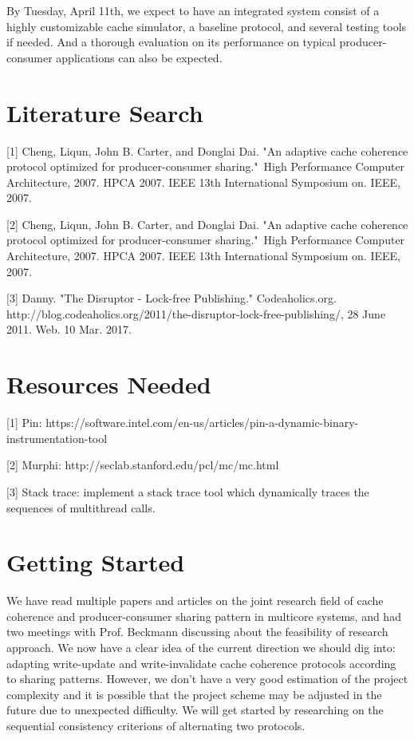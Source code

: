 \documentclass{article} %
\begin{document}
By Tuesday, April 11th, we expect to have an integrated system consist of a highly customizable cache simulator, a baseline protocol, and several testing tools if needed. And a thorough evaluation on its performance on typical producer-consumer applications can also be expected.


\section{Literature Search}

\small{
[1] Cheng, Liqun, John B. Carter, and Donglai Dai. "An adaptive cache coherence protocol optimized for producer-consumer sharing." High Performance Computer Architecture, 2007. HPCA 2007. IEEE 13th International Symposium on. IEEE, 2007.

[2] Cheng, Liqun, John B. Carter, and Donglai Dai. "An adaptive cache coherence protocol optimized for producer-consumer sharing." High Performance Computer Architecture, 2007. HPCA 2007. IEEE 13th International Symposium on. IEEE, 2007.

[3] Danny. "The Disruptor - Lock-free Publishing." Codeaholics.org. http://blog.codeaholics.org/2011/the-disruptor-lock-free-publishing/, 28 June 2011. Web. 10 Mar. 2017.
}


\section{Resources Needed}

\small{
[1] Pin: https://software.intel.com/en-us/articles/pin-a-dynamic-binary-instrumentation-tool

[2] Murphi: http://seclab.stanford.edu/pcl/mc/mc.html

[3] Stack trace: implement a stack trace tool which dynamically traces the sequences of multithread calls.
}


\section{Getting Started}

We have read multiple papers and articles on the joint research field of cache coherence and producer-consumer sharing pattern in multicore systems, and had two meetings with Prof. Beckmann discussing about the feasibility of research approach. We now have a clear idea of the current direction we should dig into: adapting write-update and write-invalidate cache coherence protocols according to sharing patterns. However, we don’t have a very good estimation of the project complexity and it is possible that the project scheme may be adjusted in the future due to unexpected difficulty. We will get started by researching on the sequential consistency criterions of alternating two protocols.
\end{document}
